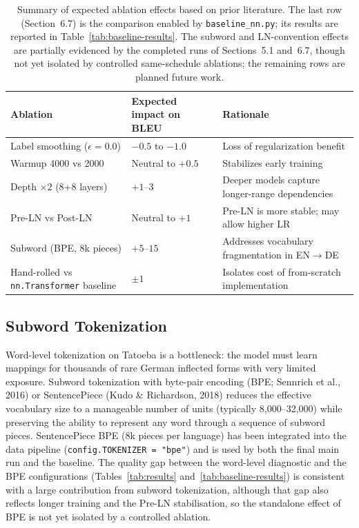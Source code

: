 \begin{table}[h]
\centering
\small
\setlength{\tabcolsep}{4pt}
\begin{tabularx}{\textwidth}{p{4.7cm} p{3.0cm} X}
\toprule
\textbf{Ablation} & \textbf{Expected impact on BLEU} & \textbf{Rationale} \\
\midrule
Label smoothing ($\epsilon=0.0$) & $-0.5$ to $-1.0$ & Loss of regularization benefit \\
Warmup 4000 vs 2000 & Neutral to $+0.5$ & Stabilizes early training \\
Depth $\times 2$ (8+8 layers) & $+1$--$3$ & Deeper models capture longer-range dependencies \\
Pre-LN vs Post-LN & Neutral to $+1$ & Pre-LN is more stable; may allow higher LR \\
Subword (BPE, 8k pieces) & $+5$--$15$ & Addresses vocabulary fragmentation in EN$\rightarrow$DE \\
Hand-rolled vs \texttt{nn.Transformer} baseline & $\pm 1$ & Isolates cost of from-scratch implementation \\
\bottomrule
\end{tabularx}
\caption{Summary of expected ablation effects based on prior literature. The last row (Section~6.7) is the comparison enabled by \texttt{baseline\_nn.py}; its results are reported in Table~\ref{tab:baseline-results}. The subword and LN-convention effects are partially evidenced by the completed runs of Sections~5.1 and~6.7, though not yet isolated by controlled same-schedule ablations; the remaining rows are planned future work.}
\label{tab:ablation}
\end{table}

\subsection{Subword Tokenization}

Word-level tokenization on Tatoeba is a bottleneck: the model must learn mappings for thousands of rare German inflected forms with very limited exposure. Subword tokenization with byte-pair encoding (BPE; Sennrich et al., 2016) or SentencePiece (Kudo \& Richardson, 2018) reduces the effective vocabulary size to a manageable number of units (typically 8,000--32,000) while preserving the ability to represent any word through a sequence of subword pieces. SentencePiece BPE (8k pieces per language) has been integrated into the data pipeline (\texttt{config.TOKENIZER = "bpe"}) and is used by both the final main run and the baseline. The quality gap between the word-level diagnostic and the BPE configurations (Tables~\ref{tab:results} and~\ref{tab:baseline-results}) is consistent with a large contribution from subword tokenization, although that gap also reflects longer training and the Pre-LN stabilisation, so the standalone effect of BPE is not yet isolated by a controlled ablation.

